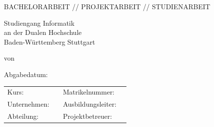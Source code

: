 \documentclass[12pt]{report}
\begin{document}
 
	\begin{titlepage}
		\thispagestyle{titlepage}
		\newcommand\HRule{\rule{\textwidth}{1pt}} %

		
		\begin{center}
			
			\vspace*{2cm}
			
			{ \huge \bfseries \MakeUppercase{\meinTitel}}
			
			\vspace*{1.5cm}
			
			\Large BACHELORARBEIT // PROJEKTARBEIT // STUDIENARBEIT
			
			\vspace*{3cm}
			
			{\LARGE Studiengang Informatik}\\
			{\LARGE an der Dualen Hochschule}\\
			{\LARGE Baden-Württemberg Stuttgart}\\

			\vspace*{2.5cm}
			
			\Large von \meinName
			
			\vspace*{1.5cm}
			
			\Large Abgabedatum: \abgabeDatum

			\begin{table}[bp]
				\begin{tabular}{l l l l}
					Kurs: & \meinKurs & Matrikelnummer: & \meineMatrikelNr  \\
					Unternehmen: & \firmenName & Ausbildungsleiter: & \ausbildungsLeiter\\
					Abteilung: &  \abteilungsName & Projektbetreuer: &  \projektBetreuer\\
				\end{tabular}
			\end{table}
			
			
		\end{center}
		
	\end{titlepage}



\fancypagestyle{plain}{
	\fancyfoot[L]{\meinName\\
		 - \meinKurs}
	\fancyfoot[C]{Seite \thepage\ }%
	\fancyfoot[R]{\abgabeDatum}
}
\end{document}
